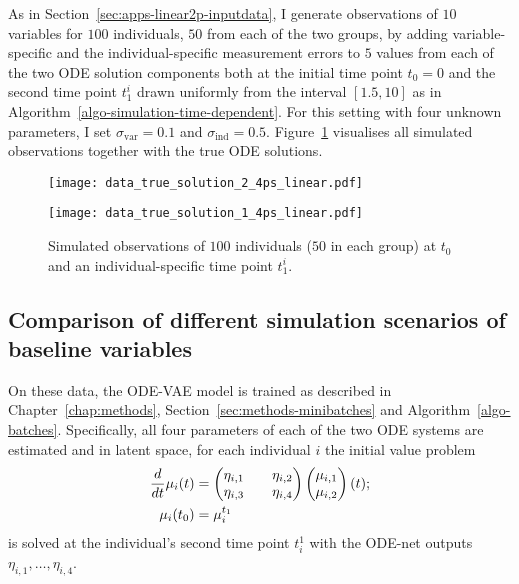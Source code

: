 As in Section~\ref{sec:apps-linear2p-inputdata}, I generate observations of $10$ variables for $100$ individuals, $50$ from each of the two groups, by adding variable-specific and the individual-specific measurement errors to $5$ values from each of the two ODE solution components both at the initial time point $t_0 = 0$ and the second time point $t_1^i$ drawn uniformly from the interval $[1.5, 10]$ as in Algorithm~\ref{algo-simulation-time-dependent}. For this setting with four unknown parameters, I set $\sigma_{\mathrm{var}}= 0.1$ and $\sigma_{\mathrm{ind}} = 0.5$. Figure~\ref{fig:apps-data_truesolution_4ps_linear} visualises all simulated observations together with the true ODE solutions.
\begin{figure}
	\centering
	\begin{minipage}{.5\linewidth}
		\centering
		\texttt{[image: data\_true\_solution\_2\_4ps\_linear.pdf]}
	\end{minipage}\begin{minipage}{.5\linewidth}
		\centering
		\texttt{[image: data\_true\_solution\_1\_4ps\_linear.pdf]}
	\end{minipage}
	\caption{Simulated observations of $100$ individuals ($50$ in each group) at $t_0$ and an individual-specific time point $t_1^i$.}
	\label{fig:apps-data_truesolution_4ps_linear}
\end{figure}

\subsection{Comparison of different simulation scenarios of baseline variables}

On these data, the ODE-VAE model is trained as described in Chapter~\ref{chap:methods}, Section~\ref{sec:methods-minibatches} and Algorithm~\ref{algo-batches}. Specifically, all four parameters of each of the two ODE systems are estimated and in latent space, for each individual $i$ the initial value problem 
\begin{equation*}
	\begin{split}
		\frac{d}{dt} \mu_i(t) &= \begin{pmatrix} \eta_{i,1} && \eta_{i,2} \\ \eta_{i,3} && \eta_{i,4}	\end{pmatrix} \begin{pmatrix} \mu_{i,1} \\ \mu_{i,2}	\end{pmatrix} (t); \\
		\mu_i(t_0) &= \mu_i^{t_1}
	\end{split}
\end{equation*}
is solved at the individual's second time point $t_i^1$ with the ODE-net outputs $\eta_{i,1}, \dots, \eta_{i,4}$. 

